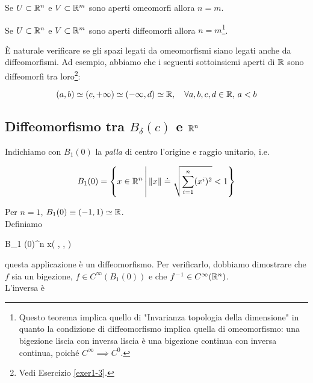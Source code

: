 \begin{theorem}
	Se $ U \subset \mathbb{R}^{n} $ e $ V \subset \mathbb{R}^{m} $ sono aperti omeomorfi allora $ n = m $.
\end{theorem}

\begin{theorem}
	Se $ U \subset \mathbb{R}^{n} $ e $ V \subset \mathbb{R}^{m} $ sono aperti diffeomorfi allora $ n = m $\footnote{%
		Questo teorema implica quello di "Invarianza topologia della dimensione" in quanto la condizione di diffeomorfismo implica quella di omeomorfismo: una bigezione liscia con inversa liscia è una bigezione continua con inversa continua, poiché $ C^{\infty} \implies C^{0} $.%
	}.
\end{theorem}

È naturale verificare se gli spazi legati da omeomorfismi siano legati anche da diffeomorfismi. Ad esempio, abbiamo che i seguenti sottoinsiemi aperti di $ \mathbb{R} $ sono diffeomorfi tra loro\footnote{%
	Vedi Esercizio \ref{exer1-3}.%
}:

\begin{equation}
	(a,b) \simeq (c, + \infty) \simeq (- \infty, d) \simeq \R %
	\qcomma \forall a,b,c,d \in \R, \, a < b
\end{equation}

\subsection{Diffeomorfismo tra $ B_{\delta} (c) $ e $ \mathbb{R}^{n} $}

Indichiamo con $ B_{1} (0) $ la \textit{palla} di centro l'origine e raggio unitario, i.e.

\begin{equation}
	B_{1} (0) = \left\{ x \in \mathbb{R}^{n} \, \middle| \, \norm{x} \doteq \sqrt{\sum_{i=1}^{n} (x^{i})^{2}} < 1 \right\}
\end{equation}

Per $ n=1 $, $ B_{1} (0) \equiv (-1,1) \simeq \mathbb{R} $. \\
Definiamo

	{B_{1} (0)}{\R^{n}}
	{x}{\left( , \cdots,  \right)}

questa applicazione è un diffeomorfismo. Per verificarlo, dobbiamo dimostrare che $ f $ sia un bigezione, $ f \in C^{\infty}(B_{1}(0)) $ e che $ f^{-1} \in C^{\infty}(\mathbb{R}^{n}) $. \\
L'inversa è

